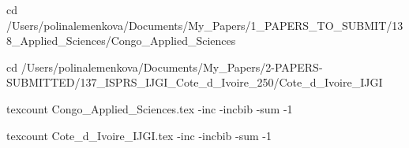 cd /Users/polinalemenkova/Documents/My_Papers/1_PAPERS_TO_SUBMIT/138_Applied_Sciences/Congo_Applied_Sciences

cd /Users/polinalemenkova/Documents/My_Papers/2-PAPERS-SUBMITTED/137_ISPRS_IJGI_Cote_d_Ivoire_250/Cote_d_Ivoire_IJGI

texcount Congo_Applied_Sciences.tex -inc -incbib -sum -1

texcount Cote_d_Ivoire_IJGI.tex -inc -incbib -sum -1
